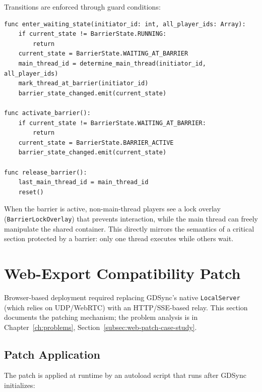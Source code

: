 Transitions are enforced through guard conditions:

\begin{lstlisting}[caption={Barrier state transitions (barrier\_manager.gd)}]
func enter_waiting_state(initiator_id: int, all_player_ids: Array):
    if current_state != BarrierState.RUNNING:
        return
    current_state = BarrierState.WAITING_AT_BARRIER
    main_thread_id = determine_main_thread(initiator_id, all_player_ids)
    mark_thread_at_barrier(initiator_id)
    barrier_state_changed.emit(current_state)

func activate_barrier():
    if current_state != BarrierState.WAITING_AT_BARRIER:
        return
    current_state = BarrierState.BARRIER_ACTIVE
    barrier_state_changed.emit(current_state)

func release_barrier():
    last_main_thread_id = main_thread_id
    reset()
\end{lstlisting}

When the barrier is active, non-main-thread players see a lock overlay (\texttt{BarrierLockOverlay}) that prevents interaction, while the main thread can freely manipulate the shared container. This directly mirrors the semantics of a critical section protected by a barrier: only one thread executes while others wait.

\section{Web-Export Compatibility Patch}
\label{sec:web-patch-implementation}

Browser-based deployment required replacing GDSync's native \texttt{LocalServer} (which relies on UDP/WebRTC) with an HTTP/SSE-based relay. This section documents the patching mechanism; the problem analysis is in Chapter~\ref{ch:problems}, Section~\ref{subsec:web-patch-case-study}.

\subsection{Patch Application}
\label{subsec:patch-application}

The patch is applied at runtime by an autoload script that runs after GDSync initializes:

